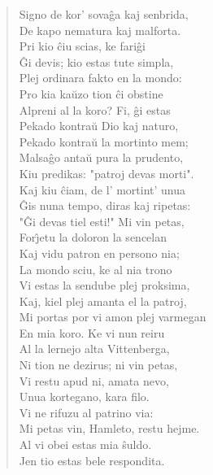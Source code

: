 \begin{verse}
                Signo de kor' sova\^ga kaj senbrida,\\
                De kapo nematura kaj malforta.\\
                Pri kio \^ciu scias, ke fari\^gi\\
                \^Gi devis; kio estas tute simpla,\\
                Plej ordinara fakto en la mondo:\\
                Pro kia ka\u uzo tion \^ci obstine\\
                Alpreni al la koro? Fi, \^gi estas\\
                Pekado kontra\u u Dio kaj naturo,\\
                Pekado kontra\u u la mortinto mem;\\
                Malsa\^go anta\u u pura la prudento,\\
                Kiu predikas: "patroj devas morti".\\
                Kaj kiu \^ciam, de l' mortint' unua\\
                \^Gis nuna tempo, diras kaj ripetas:\\
                "\^Gi devas tiel esti!" Mi vin petas,\\
                For\^{\j}etu la doloron la sencelan\\
                Kaj vidu patron en persono nia;\\
                La mondo sciu, ke al nia trono\\
                Vi estas la sendube plej proksima,\\
                Kaj, kiel plej amanta el la patroj,\\
                Mi portas por vi amon plej varmegan\\
                En mia koro. Ke vi nun reiru\\
                Al la lernejo alta Vittenberga,\\
                Ni tion ne dezirus; ni vin petas,\\
                Vi restu apud ni, amata nevo,\\
                Unua kortegano, kara filo.\\
 Vi ne rifuzu al patrino via:\\
                Mi petas vin, Hamleto, restu hejme.\\
 Al vi obei estas mia \^suldo.\\
 Jen tio estas bele respondita.\\

\end{verse}
